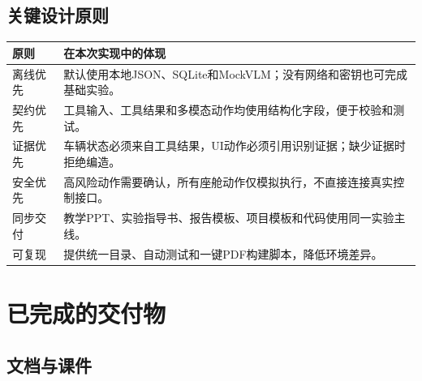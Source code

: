 \documentclass[UTF8,zihao=-4]{ctexart}
\begin{document}
\subsection{关键设计原则}

\begin{tabularx}{\textwidth}{L{3.2cm} Y}
\toprule
原则 & 在本次实现中的体现\\
\midrule
离线优先 & 默认使用本地JSON、SQLite和MockVLM；没有网络和密钥也可完成基础实验。\\
契约优先 & 工具输入、工具结果和多模态动作均使用结构化字段，便于校验和测试。\\
证据优先 & 车辆状态必须来自工具结果，UI动作必须引用识别证据；缺少证据时拒绝编造。\\
安全优先 & 高风险动作需要确认，所有座舱动作仅模拟执行，不直接连接真实控制接口。\\
同步交付 & 教学PPT、实验指导书、报告模板、项目模板和代码使用同一实验主线。\\
可复现 & 提供统一目录、自动测试和一键PDF构建脚本，降低环境差异。\\
\bottomrule
\end{tabularx}

\clearpage
\section{已完成的交付物}

\subsection{文档与课件}
\end{document}
